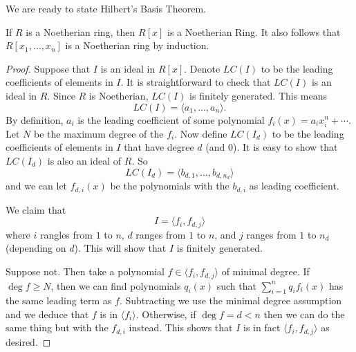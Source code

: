 We are ready to state Hilbert's Basis Theorem.
\begin{theorem}
If $R$ is a Noetherian ring, then $R[x]$ is a Noetherian Ring. It also follows that $R[x_1, \dots, x_n]$ is a Noetherian ring by induction.
\end{theorem}
\begin{proof}
Suppose that $I$ is an ideal in $R[x]$. Denote $LC(I)$ to be the leading coefficients of elements in $I$. It is straightforward to check that $LC(I)$ is an ideal in $R$. Since $R$ is Noetherian, $LC(I)$ is finitely generated. This means
\[LC(I) = \langle a_1, \dots, a_n \rangle.\]
By definition, $a_i$ is the leading coefficient of some polynomial $f_i(x) = a_ix^n_i + \cdots$. Let $N$ be the maximum degree of the $f_i$. Now define $LC(I_d)$ to be the leading coefficients of elements in $I$ that have degree $d$ (and $0$). It is easy to show that $LC(I_d)$ is also an ideal of $R$. So
\[LC(I_d) = \langle b_{d,1}, \dots, b_{d, n_d} \rangle\] and we can let $f_{d, i}(x)$ be the polynomials with the $b_{d, i}$ as leading coefficient.

We claim that 
\[I = \langle f_i, f_{d, j} \rangle\] where $i$ rangles from $1$ to $n$, $d$ ranges from $1$ to $n$, and $j$ ranges from $1$ to $n_d$ (depending on $d$). This will show that $I$ is finitely generated.

Suppose not. Then take a polynomial $f \in \langle f_i, f_{d, j} \rangle$ of minimal degree. If $\deg{f} \geq N$, then we can find polynomials $q_i(x)$ such that $\sum_{i = 1}^nq_if_i(x)$ has the same leading term as $f$. Subtracting we use the minimal degree assumption and we deduce that $f$ is in $\langle f_i \rangle$.
Otherwise, if $\deg{f} = d < n$ then we can do the same thing but with the $f_{d, i}$ instead. This shows that $I$ is in fact $\langle f_i, f_{d, j}\rangle$ as desired.
\end{proof}
